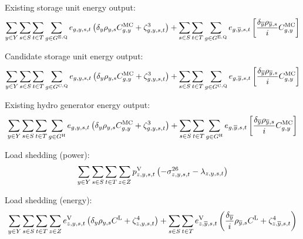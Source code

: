 \documentclass{article}
\newcommand{\sGeneratorsHydro}{G^{\mathrm{H}}}
\newcommand{\sStorageExisting}{G^{\mathrm{E,Q}}}
\newcommand{\sStorageCandidate}{G^{\mathrm{C,Q}}}
\newcommand{\sScenarios}{S}
\newcommand{\sIntervals}{T}
\newcommand{\sZones}{Z}
\newcommand{\iGenerator}{g}
\newcommand{\iYear}{y}
\newcommand{\iYearTerminal}{\overline{\iYear}}
\newcommand{\iScenario}{s}
\newcommand{\iInterval}{t}
\newcommand{\iZone}{z}
\newcommand{\cScenarioDuration}[1][\iYear,\iScenario]{\rho_{#1}}
\newcommand{\cMarginalCost}[1][\iGenerator,\iYear]{C^{\mathrm{MC}}_{#1}}
\newcommand{\cInterestRate}{i}
\newcommand{\cLostLoadCost}{C^{\mathrm{L}}}
\newcommand{\cDiscountRate}[1][\iYear]{\delta_{#1}}
\newcommand{\vEnergy}[1][\iGenerator,\iYear,\iScenario,\iInterval]{e_{#1}}
\newcommand{\vLostLoadEnergy}[1][\iZone,\iYear,\iScenario,\iInterval]{e^{\mathrm{V}}_{#1}}
\newcommand{\vLostLoadPower}[1][\iZone,\iYear,\iScenario,\iInterval]{p^{\mathrm{V}}_{#1}}
\newcommand{\dNonNegativeLostLoad}[1][\iZone,\iYear,\iScenario,\iInterval]{\sigma_{#1}^{26}}
\newcommand{\dPowerBalance}[1][\iZone,\iYear,\iScenario,\iInterval]{\lambda_{#1}}
\newcommand{\dStorageEnergyOutput}[1][\iGenerator,\iYear,\iScenario,\iInterval]{\zeta_{#1}^{3}}
\newcommand{\dLostLoadEnergy}[1][\iZone,\iYear,\iScenario,\iInterval]{\zeta_{#1}^{4}}
\begin{document}
Existing storage unit energy output:
\begin{equation}
	\sumIntervals \sum\limits_{\iGenerator \in \sStorageExisting} \vEnergy \left(\cDiscountRate\cScenarioDuration \cMarginalCost + \dStorageEnergyOutput \right) + \sum\limits_{\iScenario \in \sScenarios} \sum\limits_{\iInterval \in \sIntervals} \sum\limits_{\iGenerator \in \sStorageExisting} \vEnergy[\iGenerator,\iYearTerminal,\iScenario,\iInterval] \left[ \frac{\cDiscountRate[\iYearTerminal] \cScenarioDuration[\iYearTerminal,\iScenario]}{\cInterestRate} \cMarginalCost \right]
\end{equation}

Candidate storage unit energy output:
\begin{equation}
	\sumIntervals \sum\limits_{\iGenerator \in \sStorageCandidate} \vEnergy \left(\cDiscountRate\cScenarioDuration \cMarginalCost + \dStorageEnergyOutput \right) + \sum\limits_{\iScenario \in \sScenarios} \sum\limits_{\iInterval \in \sIntervals} \sum\limits_{\iGenerator \in \sStorageCandidate} \vEnergy[\iGenerator,\iYearTerminal,\iScenario,\iInterval] \left[ \frac{\cDiscountRate[\iYearTerminal] \cScenarioDuration[\iYearTerminal,\iScenario]}{\cInterestRate} \cMarginalCost \right]
\end{equation}

Existing hydro generator energy output:
\begin{equation}
	\sumIntervals \sum\limits_{\iGenerator \in \sGeneratorsHydro} \vEnergy \left(\cDiscountRate\cScenarioDuration \cMarginalCost + \dStorageEnergyOutput \right) + \sum\limits_{\iScenario \in \sScenarios} \sum\limits_{\iInterval \in \sIntervals} \sum\limits_{\iGenerator \in \sGeneratorsHydro} \vEnergy[\iGenerator,\iYearTerminal,\iScenario,\iInterval] \left[ \frac{\cDiscountRate[\iYearTerminal] \cScenarioDuration[\iYearTerminal,\iScenario]}{\cInterestRate} \cMarginalCost \right]
\end{equation}

Load shedding (power):
\begin{equation}
	\sumIntervals \sum\limits_{\iZone \in \sZones} \vLostLoadPower \left(- \dNonNegativeLostLoad - \dPowerBalance\right)
\end{equation}

Load shedding (energy):
\begin{equation}
	\sumIntervals \sum\limits_{\iZone \in \sZones} \vLostLoadEnergy \left(\cDiscountRate \cScenarioDuration \cLostLoadCost + \dLostLoadEnergy \right) + \sum\limits_{\iScenario \in \sScenarios}\sum\limits_{\iInterval \in \sIntervals} \vLostLoadEnergy[\iZone,\iYearTerminal,\iScenario,\iInterval] \left( \frac{\cDiscountRate[\iYearTerminal]}{\cInterestRate} \cScenarioDuration[\iYearTerminal,\iScenario] \cLostLoadCost + \dLostLoadEnergy[\iZone,\iYearTerminal,\iScenario,\iInterval] \right)
\end{equation}
\end{document}
